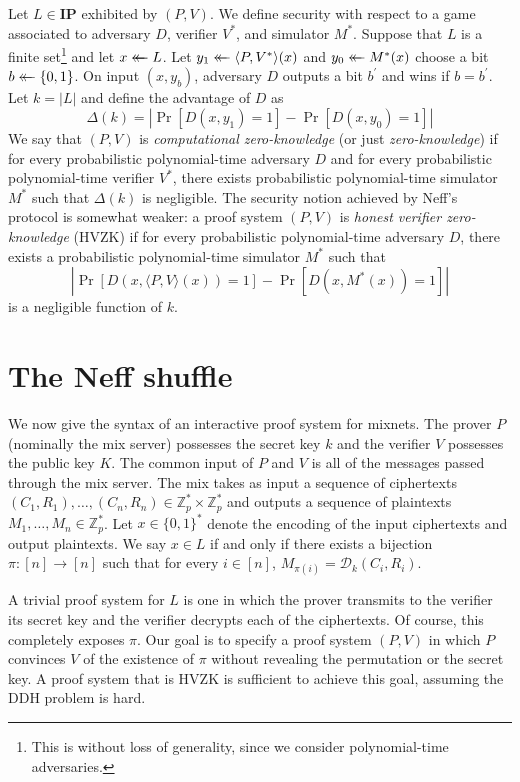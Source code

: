\documentclass[letter]{article}
\newcounter{foot}
\newcommand{\Zmodp}{\mathbb{Z}_p}
\newcommand{\bits}{\{0,1\}}
\newcommand*\by{\times}
\newcommand{\getsr}{\mathrel{\leftarrow\mkern-14mu\leftarrow}}
\newcommand{\brackets}[1]{\langle #1 \rangle}
\newcommand{\class}[1]{\mathbf{#1}}
\newcommand{\pk}{K}
\newcommand{\sk}{k}
\newcommand{\varm}{M}
\newcommand{\varc}{C}
\newcommand{\varr}{R}
\newcommand{\advD}{D}
\newcommand{\dec}{\mathcal{D}}
\begin{document}
Let $L \in \class{IP}$
exhibited by $(P, V)$. We define security with respect to a game associated to
adversary $D$, verifier $V^*$, and simulator $M^*$. Suppose that $L$ is a finite
set\footnote{This is without loss of generality, since we
consider polynomial-time adversaries.} and let $x \getsr L$. Let $y_1 \getsr
\brackets{P, V^*}(x)$ and $y_0 \getsr M^*(x)$ choose a bit $b \getsr \bits$.
On input $(x, y_b)$, adversary $\advD$ outputs a bit $b^\prime$ and wins if
$b=b^\prime$. Let $k = |L|$ and define the advantage of $\advD$ as
\[
  \Delta(k) = |\Pr[\advD(x, y_1)=1] - \Pr[\advD(x, y_0)=1]|
\]
We say that $(P, V)$ is \emph{computational zero-knowledge} (or just
\emph{zero-knowledge}) if
for every probabilistic polynomial-time adversary $\advD$ and
  for every probabilistic polynomial-time verifier $V^*$,
    there exists probabilistic polynomial-time simulator $M^*$ such that $\Delta(k)$ is
    negligible.
The security notion achieved by Neff's protocol is somewhat weaker: a proof system $(P, V)$ is
\emph{honest verifier zero-knowledge} (HVZK) if
for every probabilistic polynomial-time adversary $\advD$,
  there exists a probabilistic polynomial-time simulator $M^*$ such that
\[
  |\Pr[\advD(x, \brackets{P,V}(x))=1] - \Pr[\advD(x, M^*(x))=1]|
\]
is a negligible function of $k$.

\section{The Neff shuffle} \label{section:neff-shuffle}

We now give the syntax of an interactive proof system for mixnets. The prover
$P$ (nominally the mix server) possesses the secret key $\sk$ and the verifier
$V$ possesses the public key $\pk$. The common input of $P$ and $V$ is all of
the messages passed through the mix server. The mix takes as input a sequence of
ciphertexts $(\varc_1, \varr_1), \ldots, (\varc_n, \varr_n) \in \Zmodp^* \by
\Zmodp^*$ and outputs a sequence of plaintexts $\varm_{1}, \ldots, \varm_{n} \in
\Zmodp^*$. Let $x \in \bits^*$ denote the encoding of the input ciphertexts and
output plaintexts. We say $x \in L$ if and only if there exists a bijection $\pi
: [n] \rightarrow [n] $ such that for every $i \in [n]$,
$\varm_{\pi(i)} = \dec_k(\varc_{i}, \varr_{i})$.

A trivial proof system for $L$ is one in which the prover transmits to the
verifier its secret key and the verifier decrypts each of the ciphertexts. Of
course, this completely exposes $\pi$. Our goal is to specify a proof system
$(P, V)$ in which $P$ convinces $V$ of the existence of $\pi$ without revealing
the permutation or the secret key. A proof system that is HVZK is sufficient to
achieve this goal, assuming the DDH problem is hard.
\end{document}
